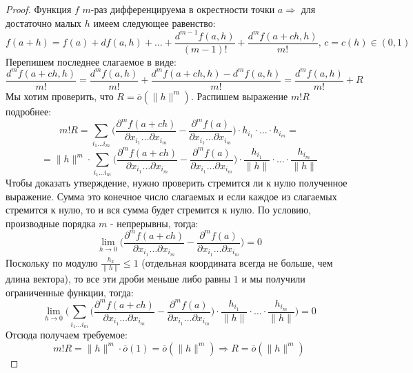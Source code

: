 \documentclass[12pt]{article}
\theoremstyle{definition}
\begin{document}
\begin{proof}
	Функция $f$ $m$-раз дифференцируема в окрестности точки $a \Rightarrow$ для достаточно малых $h$ имеем следующее равенство:
	$$
		f(a + h) = f(a) + df(a,h) + \dotsc + \dfrac{d^{m-1}f(a,h)}{(m-1)!} + \dfrac{d^mf(a+ch,h)}{m!} , \, c = c(h) \in (0,1)
	$$
	Перепишем последнее слагаемое в виде:
	$$
		\dfrac{d^mf(a+ch,h)}{m!} = \dfrac{d^mf(a,h)}{m!} + \dfrac{d^mf(a+ch,h)- d^mf(a,h)}{m!} = \dfrac{d^mf(a,h)}{m!} + R
	$$
	Мы хотим проверить, что $R =\overline{o}(\|h\|^m)$. Распишем выражение $m!R$ подробнее:
	$$
		m!R = \displaystyle \sum\limits_{i_1\dotsc i_m}\bigg(\dfrac{\partial^m f(a + ch)}{\partial x_{i_1}\dotsc\partial x_{i_m}} - \dfrac{\partial^m f(a)}{\partial x_{i_1}\dotsc\partial x_{i_m}} \bigg){\cdot}h_{i_1}{\cdot}\dotsc{\cdot}h_{i_m} = 
	$$
	$$
		=	\|h\|^m {\cdot} \displaystyle \sum\limits_{i_1\dotsc i_m}\bigg(\dfrac{\partial^m f(a + ch)}{\partial x_{i_1}\dotsc\partial x_{i_m}} - \dfrac{\partial^m f(a)}{\partial x_{i_1}\dotsc\partial x_{i_m}} \bigg){\cdot}\dfrac{h_{i_1}}{\|h\|}{\cdot}\dotsc{\cdot}\dfrac{h_{i_m}}{\|h\|}
	$$
	Чтобы доказать утверждение, нужно проверить стремится ли к нулю полученное выражение. Сумма это конечное число слагаемых и если каждое из слагаемых стремится к нулю, то и вся сумма будет стремится к нулю. По условию, производные порядка $m$ - непрерывны, тогда:
	$$
		\lim\limits_{h \to 0}\bigg(\dfrac{\partial^m f(a + ch)}{\partial x_{i_1}\dotsc\partial x_{i_m}} - \dfrac{\partial^m f(a)}{\partial x_{i_1}\dotsc\partial x_{i_m}} \bigg) = 0
	$$
	Поскольку по модулю $\tfrac{h_k}{\|h\|} \leq 1$ (отдельная координата всегда не больше, чем длина вектора), то все эти дроби меньше либо равны $1$ и мы получили ограниченные функции, тогда: 
	$$
		\lim\limits_{h \to 0} \bigg(\displaystyle \sum\limits_{i_1\dotsc i_m}\bigg(\dfrac{\partial^m f(a + ch)}{\partial x_{i_1}\dotsc\partial x_{i_m}} - \dfrac{\partial^m f(a)}{\partial x_{i_1}\dotsc\partial x_{i_m}} \bigg){\cdot}\dfrac{h_{i_1}}{\|h\|}{\cdot}\dotsc{\cdot}\dfrac{h_{i_m}}{\|h\|}
		\bigg) = 0 
	$$
	Отсюда получаем требуемое:
	$$
		m!R = \|h\|^m{\cdot}\overline{o}(1) = \overline{o}(\|h\|^m) \Rightarrow R = \overline{o}(\|h\|^m)
	$$
\end{proof}
\end{document}
